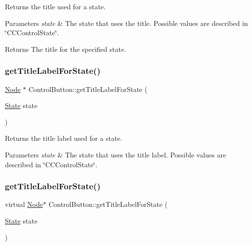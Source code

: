 Returns the title used for a state.


\begin{DoxyParams}{Parameters}
{\em state} & The state that uses the title. Possible values are described in \char`\"{}\+C\+C\+Control\+State\char`\"{}.\\
\hline
\end{DoxyParams}
\begin{DoxyReturn}{Returns}
The title for the specified state. 
\end{DoxyReturn}
\mbox{\label{classControlButton_ac0d4a47f4324d6c5ab6d69ba0e7b6d50}} 
\subsubsection{\texorpdfstring{get\+Title\+Label\+For\+State()}{getTitleLabelForState()}\hspace{0.1cm}{\footnotesize\ttfamily [1/2]}}
{\footnotesize\ttfamily \hyperlink{classNode}{Node} $\ast$ Control\+Button\+::get\+Title\+Label\+For\+State (\begin{DoxyParamCaption}\item[{\hyperlink{classControl_a89e9598cd785841ac91cff3c4798c469}{State}}]{state }\end{DoxyParamCaption})\hspace{0.3cm}{\ttfamily [virtual]}}

Returns the title label used for a state.


\begin{DoxyParams}{Parameters}
{\em state} & The state that uses the title label. Possible values are described in \char`\"{}\+C\+C\+Control\+State\char`\"{}. \\
\hline
\end{DoxyParams}
\mbox{\label{classControlButton_a821e4dabfed66cb39ed8ba1fe67d8a7b}} 
\subsubsection{\texorpdfstring{get\+Title\+Label\+For\+State()}{getTitleLabelForState()}\hspace{0.1cm}{\footnotesize\ttfamily [2/2]}}
{\footnotesize\ttfamily virtual \hyperlink{classNode}{Node}$\ast$ Control\+Button\+::get\+Title\+Label\+For\+State (\begin{DoxyParamCaption}\item[{\hyperlink{classControl_a89e9598cd785841ac91cff3c4798c469}{State}}]{state }\end{DoxyParamCaption})\hspace{0.3cm}{\ttfamily [virtual]}}

